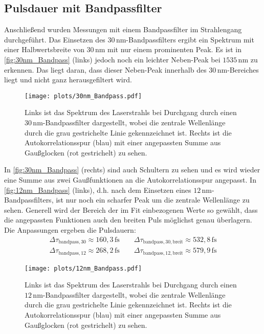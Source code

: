 \subsection{Pulsdauer mit Bandpassfilter}
    Anschließend wurden Messungen mit einem Bandpassfilter im Strahlengang durchgeführt.
    Das Einsetzen des $30\,\si{\nano\meter}$-Bandpassfilters ergibt ein Spektrum mit einer Halbwertsbreite von $30\,\si{\nano\meter}$ mit nur einem prominenten Peak.
    Es ist in \autoref{fig:30nm_Bandpass} (links) jedoch noch ein leichter Neben-Peak bei $1535\,\si{\nano\meter}$ zu erkennen.
    Das liegt daran, dass dieser Neben-Peak innerhalb des $30\,\si{\nano\meter}$-Bereiches liegt und nicht ganz herausgefiltert wird.    
    \vspace*{-0.3cm}
    \begin{figure}[ht]
        \centering\captionsetup{format=plain}
        \texttt{[image: plots/30nm\_Bandpass.pdf]} \vspace*{-0.5cm}
        \caption{Links ist das Spektrum des Laserstrahls bei Durchgang durch einen $30\,\si{\nano\meter}$-Bandpassfilter dargestellt, wobei die zentrale Wellenlänge durch die grau gestrichelte Linie gekennzeichnet ist. Rechts ist die Autokorrelationsspur (blau) mit einer angepassten Summe aus Gaußglocken (rot gestrichelt) zu sehen.}
        \label{fig:30nm_Bandpass}
    \end{figure}
    \FloatBarrier
    In \autoref{fig:30nm_Bandpass} (rechts) sind auch Schultern zu sehen und es wird wieder eine Summe aus zwei Gaußfunktionen an die Autokorrelationsspur angepasst.
    In \autoref{fig:12nm_Bandpass} (links), d.h. nach dem Einsetzen eines $12\,\si{\nano\meter}$-Bandpassfilters, ist nur noch ein scharfer Peak um die zentrale Wellenlänge zu sehen.
    Generell wird der Bereich der im Fit einbezogenen Werte so gewählt, dass die angepassten Funktionen auch den breiten Puls möglichst genau überlagern.
    Die Anpassungen ergeben die Pulsdauern:
    \begin{align*}
        \Delta \tau_{\mathrm{bandpass,30}} \approx 160,3\,\si{\femto\second} \qquad \Delta \tau_{\mathrm{bandpass,30,breit}} \approx 532,8\,\si{\femto\second} \\
        \Delta \tau_{\mathrm{bandpass,12}} \approx 268,2\,\si{\femto\second} \qquad \Delta \tau_{\mathrm{bandpass,12,breit}} \approx 579,9\,\si{\femto\second}
    \end{align*}
    \begin{figure}[ht]
        \centering\captionsetup{format=plain}\vspace*{-1cm}
        \texttt{[image: plots/12nm\_Bandpass.pdf]} \vspace*{-0.5cm}
        \caption{Links ist das Spektrum des Laserstrahls bei Durchgang durch einen $12\,\si{\nano\meter}$-Bandpassfilter dargestellt, wobei die zentrale Wellenlänge durch die grau gestrichelte Linie gekennzeichnet ist. Rechts ist die Autokorrelationsspur (blau) mit einer angepassten Summe aus Gaußglocken (rot gestrichelt) zu sehen.}
        \label{fig:12nm_Bandpass}
    \end{figure}
    \FloatBarrier

